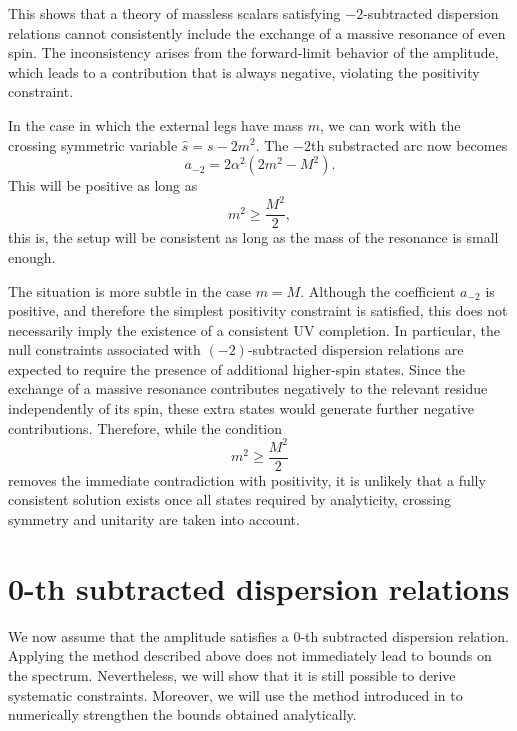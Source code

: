 This shows that a theory of massless scalars satisfying  
$-2$-subtracted dispersion relations cannot consistently include the exchange of a massive resonance of even spin. The inconsistency arises from the forward-limit behavior of the amplitude, which leads to a contribution that is always negative, violating the positivity constraint.

In the case in which the external legs have mass $m$, we can work with the crossing symmetric variable $\hat{s} = s - 2m^2$. The $-2$th substracted arc now becomes 
\begin{equation}
    a_{-2} = 2\alpha^2(2m^2 - M^2).
\end{equation}
This will be positive as long as 
\begin{equation}
    m^2 \geq \frac{M^2}{2},
\end{equation}
this is, the setup will be consistent as long as the mass of the resonance is small enough. 

The situation is more subtle in the case \(m=M\). Although the coefficient \(a_{-2}\) is positive, and therefore the simplest positivity constraint is satisfied, this does not necessarily imply the existence of a consistent UV completion. In particular, the null constraints associated with \((-2)\)-subtracted dispersion relations are expected to require the presence of additional higher-spin states. Since the exchange of a massive resonance contributes negatively to the relevant residue independently of its spin, these extra states would generate further negative contributions. Therefore, while the condition
\begin{equation}
    m^2 \geq \frac{M^2}{2}
\end{equation}
removes the immediate contradiction with positivity, it is unlikely that a fully consistent solution exists once all states required by analyticity, crossing symmetry and unitarity are taken into account. 

\section{0-th subtracted dispersion relations}

We now assume that the amplitude satisfies a 0-th subtracted dispersion relation. 
Applying the method described above does not immediately lead to bounds on the spectrum. 
Nevertheless, we will show that it is still possible to derive systematic constraints. 
Moreover, we will use the method introduced in  to numerically strengthen the bounds obtained analytically.

